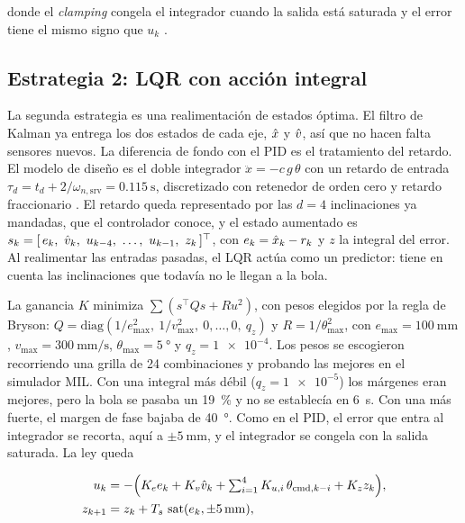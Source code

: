 donde el \emph{clamping} congela el integrador cuando la salida está saturada y el error tiene el
mismo signo que $u_k$ \cite{mw_antiwindup}.


\subsection{Estrategia 2: LQR con acción integral}

La segunda estrategia es una realimentación de estados óptima. El filtro de Kalman ya entrega los
dos estados de cada eje, $\hat{x}$ y $\hat{v}$, así que no hacen falta sensores nuevos. La diferencia de
fondo con el PID es el tratamiento del retardo. El modelo de diseño es el doble integrador
$\ddot x = -c\,g\,\theta$ con un retardo de entrada $\tau_d = t_d + 2/\omega_{n,\mathrm{srv}} =
\SI{0.115}{\second}$, discretizado con retenedor de orden cero y retardo fraccionario
\cite{astrom1997}. El retardo queda representado por las $d = 4$ inclinaciones ya mandadas, que
el controlador conoce, y el estado aumentado es
$s_k = [\,e_k,\ \vh_k,\ u_{k-4},\ \dots,\ u_{k-1},\ z_k\,]^{\top}$, con $e_k = \hat{x}_k - r_k$ y
$z$ la integral del error. Al realimentar las entradas pasadas, el LQR actúa como un predictor:
tiene en cuenta las inclinaciones que todavía no le llegan a la bola.

La ganancia $K$ minimiza $\sum (s^{\top}Qs + Ru^{2})$, con pesos elegidos por la regla de Bryson:
$Q = \mathrm{diag}(1/e_{\max}^{2},\ 1/v_{\max}^{2},\ 0,\dots,0,\ q_z)$ y $R = 1/\theta_{\max}^{2}$,
con $e_{\max} = \SI{100}{\milli\metre}$, $v_{\max} = \SI{300}{\milli\metre\per\second}$,
$\theta_{\max} = \SI{5}{\degree}$ y $q_z = \num{1e-4}$. Los pesos se escogieron recorriendo una
grilla de 24 combinaciones y probando las mejores en el simulador MIL. Con una integral más débil
($q_z = \num{1e-5}$) los márgenes eran mejores, pero la bola se pasaba un \SI{19}{\percent} y no
se establecía en \SI{6}{\second}. Con una más fuerte, el margen de fase bajaba de \SI{40}{\degree}.
Como en el PID, el error que entra al integrador se recorta, aquí a $\pm\SI{5}{\milli\metre}$, y el
integrador se congela con la salida saturada. La ley queda

\begin{equation}
\begin{aligned}
u_k &= -\Bigl(K_e e_k + K_v \hat{v}_k + \textstyle\sum_{i=1}^{4} K_{u,i}\,\theta_{\mathrm{cmd},k-i} + K_z z_k\Bigr),\\
z_{k+1} &= z_k + T_s\,\operatorname{sat}(e_k, \pm\SI{5}{\milli\metre}),
\end{aligned}
\label{eq:lqr}
\end{equation}

